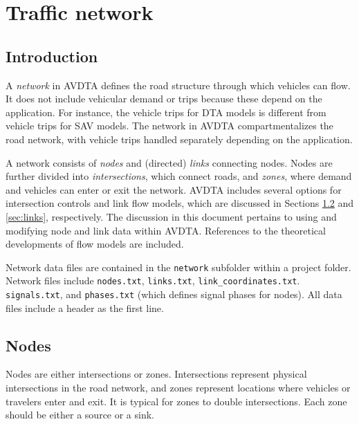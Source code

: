 \chapter{Traffic network}
\label{ch:network}


\section{Introduction}
A \textit{network} in AVDTA defines the road structure through which vehicles can flow. It does not include vehicular demand or trips because these depend on the application. For instance, the vehicle trips for DTA models is different from vehicle trips for SAV models. The network in AVDTA compartmentalizes the road network, with vehicle trips handled separately depending on the application.

A network consists of \textit{nodes} and (directed) \textit{links} connecting nodes. Nodes are further divided into \textit{intersections}, which connect roads, and \textit{zones}, where demand and vehicles can enter or exit the network. AVDTA includes several options for intersection controls and link flow models, which are discussed in Sections \ref{sec:nodes} and \ref{sec:links}, respectively. The discussion in this document pertains to using and modifying node and link data within AVDTA. References to the theoretical developments of flow models are included.

Network data files are contained in the \texttt{network} subfolder within a project folder. Network files include \texttt{nodes.txt}, \texttt{links.txt}, \texttt{link\_coordinates.txt}. \texttt{signals.txt}, and \texttt{phases.txt} (which defines signal phases for nodes). All data files include a header as the first line. 

\section{Nodes}
\label{sec:nodes}

Nodes are either intersections or zones. Intersections represent physical intersections in the road network, and zones represent locations where vehicles or travelers enter and exit. It is typical for zones to double intersections. Each zone should be either a source or a sink.

